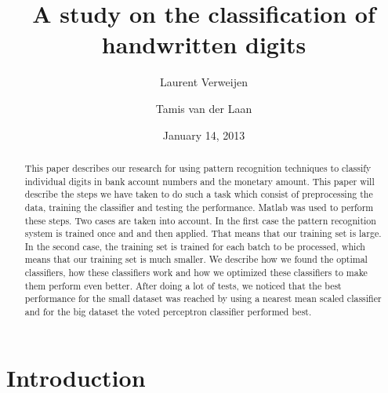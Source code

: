 \documentclass[%
        compressed,
        final,
        notitlepage,
        narroweqnarray,
        inline,
        twoside,
        ]{ieee}
\title{A study on the classification of handwritten digits}
\author{Laurent Verweijen \and Tamis van der Laan}
\date{January 14, 2013}
\begin{document}
\maketitle

\begin{abstract}
This paper describes our research for using pattern recognition techniques to classify individual digits in bank account numbers and the monetary amount. This paper will describe the steps we have taken to do such a task which consist of preprocessing the data, training the classifier and testing the performance. Matlab was used to perform these steps. Two cases are taken into account. In the first case the pattern recognition system is trained once and and then applied. That means that our training set is large. In the second case, the training set is trained for each batch to be processed, which means that our training set is much smaller. We describe how we found the optimal classifiers, how these classifiers work and how we optimized these classifiers to make them perform even better. After doing a lot of tests, we noticed that the best performance for the small dataset was reached by using a nearest mean scaled classifier and for the big dataset the voted perceptron classifier performed best. 
\end{abstract}

\section{Introduction}
\end{document}
